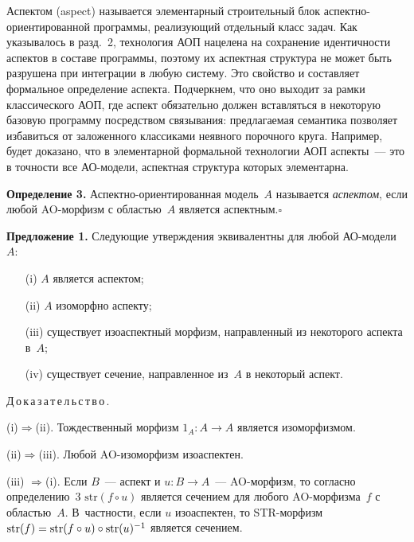 \begin{multicols}{2}
   Аспектом (aspect) называется элементарный строительный блок 
   ас\-пект\-но-ори\-ен\-ти\-ро\-ван\-ной программы, реализующий отдельный 
класс задач. Как указывалось в разд.~2, технология АОП нацелена на 
сохранение идентичности аспектов в составе программы, поэтому их аспектная 
структура не может быть разрушена при интеграции в любую сис\-те\-му. Это 
свойство и составляет формальное определение аспекта. Подчеркнем, что оно 
выходит за рамки классического АОП, где аспект обязательно должен 
вставляться в некоторую базовую программу посредством связывания: 
предлагаемая семантика позволяет избавиться от заложенного классиками 
неявного порочного круга. Например, будет доказано, что в элементарной 
формальной технологии АОП аспекты~--- это в точности все АО-мо\-де\-ли, 
аспектная структура которых элементарна.
  
  \medskip
  
  \noindent
  \textbf{Определение 3.} Аспектно-ориентированная модель~$A$ называется \textit{аспектом}, если 
любой AO-мор\-физм с областью~$A$ является аспектным.\hfill$\square$
  \medskip
  
  \noindent
  \textbf{Предложение 1.} Следующие утверждения эквивалентны для любой 
АО-мо\-де\-ли~$A$:
   \begin{itemize}
\item[(i)] $A$ является аспектом;
\item[(ii)] $A$ изоморфно аспекту; 
\item[(iii)] существует изоаспектный морфизм, на\-прав\-лен\-ный из некоторого 
аспекта в~$A$;
\item[(iv)] существует сечение, направленное из~$A$ в некоторый аспект.
\end{itemize}

\medskip

\noindent
  Д\,о\,к\,а\,з\,а\,т\,е\,л\,ь\,с\,т\,в\,о\,.\ \ 
   
(i)\;$\Rightarrow$\;(ii). Тождественный морфизм $1_A : A\rightarrow A$ 
является изоморфизмом.

   (ii)\;$\Rightarrow$\;(iii). Любой AO-изо\-мор\-физм изоаспектен.
   
   (iii) \;$\Rightarrow$\;(i). Если $B$~--- аспект и $u : B\rightarrow A$~--- 
   AO-мор\-физм, то согласно определению~3 $\mathrm{str}(f \circ u)$ является сечением для 
любого  
   AO-мор\-физ\-ма~$f$ с областью~$A$. В~частности, если $u$ изоаспектен, то 
STR-мор\-физм $\mathrm{str}(f) \hm= \mathrm{str}(f \circ u) \circ \mathrm{str}(u)^{-1}$ является сечением.
   

\end{multicols}
